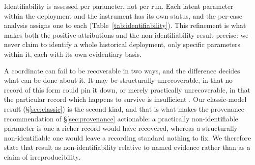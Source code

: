 Identifiability is assessed per parameter, not per run. Each latent parameter within the deployment and the instrument has its own status, and the per-case analysis assigns one to each (Table~\ref{tab:identifiability}). This refinement is what makes both the positive attributions and the non-identifiability result precise: we never claim to identify a whole historical deployment, only specific parameters within it, each with its own evidentiary basis.

A coordinate can fail to be recoverable in two ways, and the difference decides what can be done about it. It may be structurally unrecoverable, in that no record of this form could pin it down, or merely practically unrecoverable, in that the particular record which happens to survive is insufficient \citep{raue2009identifiability}. Our classic-model result (\S\ref{sec:classic}) is the second kind, and that is what makes the provenance recommendation of \S\ref{sec:provenance} actionable: a practically non-identifiable parameter is one a richer record would have recovered, whereas a structurally non-identifiable one would leave a recording standard nothing to fix. We therefore state that result as non-identifiability relative to named evidence rather than as a claim of irreproducibility.

